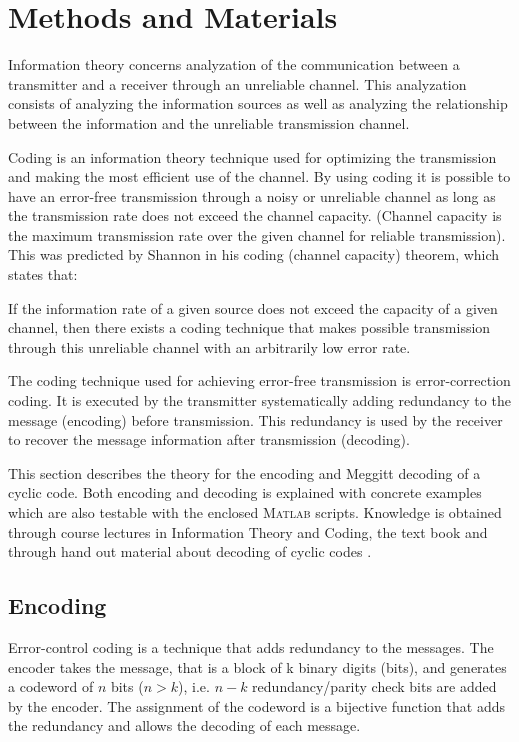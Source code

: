 \documentclass[Main]{subfiles}
\begin{document}
\section{Methods and Materials}
Information theory concerns analyzation of the communication between a transmitter and a receiver through an unreliable channel. 
This analyzation consists of analyzing the information sources as well as analyzing the relationship between the information and the unreliable transmission channel. 

Coding is an information theory technique used for optimizing the transmission and making the most efficient use of the channel.
By using coding it is possible to have an error-free transmission through a noisy or unreliable channel as long as the transmission rate does not exceed the channel capacity.
(Channel capacity is the maximum transmission rate over the given channel for reliable transmission).
This was predicted by Shannon in his coding (channel capacity) theorem, which states that: 

\begin{fquote}
If the information rate of a given source does not exceed the capacity of a given channel, then there exists a coding technique that makes possible transmission through this unreliable channel with an arbitrarily low error rate.
\end{fquote}
 
 
The coding technique used for achieving error-free transmission is error-correction coding. It is executed by the transmitter systematically adding redundancy to the message (encoding) before transmission. This redundancy is used by the receiver to recover the message information after transmission (decoding). 

This section describes the theory for the encoding and Meggitt decoding of a cyclic code. 
Both encoding and decoding is explained with concrete examples which are also testable with the enclosed \textsc{Matlab} scripts. 
Knowledge is obtained through course lectures in Information Theory and Coding, the text book \cite{book} and through hand out material about decoding of cyclic codes \cite{handout}. 

\subsection{Encoding}
Error-control coding is a technique that adds redundancy to the messages. The encoder takes the message, that is a block of k binary digits (bits), and generates a codeword of $n$ bits ($n > k$), i.e. $n - k$ redundancy/parity check bits are added by the encoder. 
The assignment of the codeword is a bijective function that adds the redundancy and allows the decoding of each message. 
\end{document}
